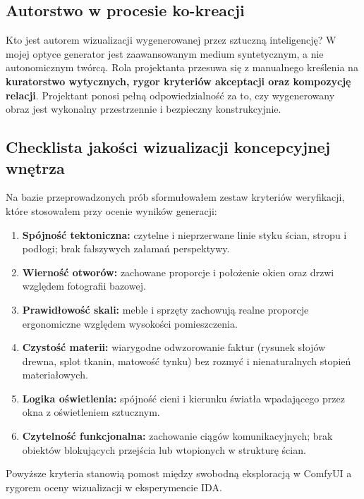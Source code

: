 \subsection{Autorstwo w procesie ko-kreacji}
Kto jest autorem wizualizacji wygenerowanej przez sztuczną inteligencję? W mojej optyce generator jest zaawansowanym medium syntetycznym, a nie autonomicznym twórcą. Rola projektanta przesuwa się z manualnego kreślenia na \textbf{kuratorstwo wytycznych, rygor kryteriów akceptacji oraz kompozycję relacji}. Projektant ponosi pełną odpowiedzialność za to, czy wygenerowany obraz jest wykonalny przestrzennie i bezpieczny konstrukcyjnie.

\subsection{Checklista jakości wizualizacji koncepcyjnej wnętrza}
\label{ch04:sec:checklista}

Na bazie przeprowadzonych prób sformułowałem zestaw kryteriów weryfikacji, które stosowałem przy ocenie wyników generacji:
\begin{enumerate}
  \item \textbf{Spójność tektoniczna:} czytelne i nieprzerwane linie styku ścian, stropu i podłogi; brak fałszywych załamań perspektywy.
  \item \textbf{Wierność otworów:} zachowane proporcje i położenie okien oraz drzwi względem fotografii bazowej.
  \item \textbf{Prawidłowość skali:} meble i sprzęty zachowują realne proporcje ergonomiczne względem wysokości pomieszczenia.
  \item \textbf{Czystość materii:} wiarygodne odwzorowanie faktur (rysunek słojów drewna, splot tkanin, matowość tynku) bez rozmyć i nienaturalnych stopień materiałowych.
  \item \textbf{Logika oświetlenia:} spójność cieni i kierunku światła wpadającego przez okna z oświetleniem sztucznym.
  \item \textbf{Czytelność funkcjonalna:} zachowanie ciągów komunikacyjnych; brak obiektów blokujących przejścia lub wtopionych w strukturę ścian.
\end{enumerate}

Powyższe kryteria stanowią pomost między swobodną eksploracją w ComfyUI a rygorem oceny wizualizacji w eksperymencie IDA.
